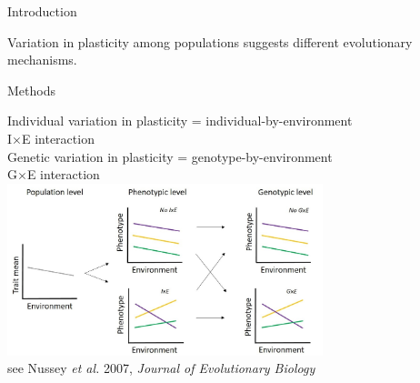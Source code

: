 \documentclass[compress]{beamer}
\begin{document}
\begin{frame}{Introduction}
 
  \vspace{0.1cm}
  \raggedright
  Variation in plasticity among populations suggests different evolutionary mechanisms.\\ 
  
  
 \end{frame}

\begin{frame}[fragile]{Methods}

\centering 
Individual variation in plasticity = individual-by-environment \\ I$\times$E interaction\\
Genetic variation in plasticity = genotype-by-environment \\ G$\times$E interaction\\

 \vspace{0.5cm}
 \centering
 \includegraphics[height = 5cm]{Chapter/Plasticitylevel.jpg} \\
 \vfill
 \raggedleft
  \tiny{see Nussey \textit{et al.} 2007, \textit{Journal of Evolutionary Biology}} 

\end{frame}
\end{document}
